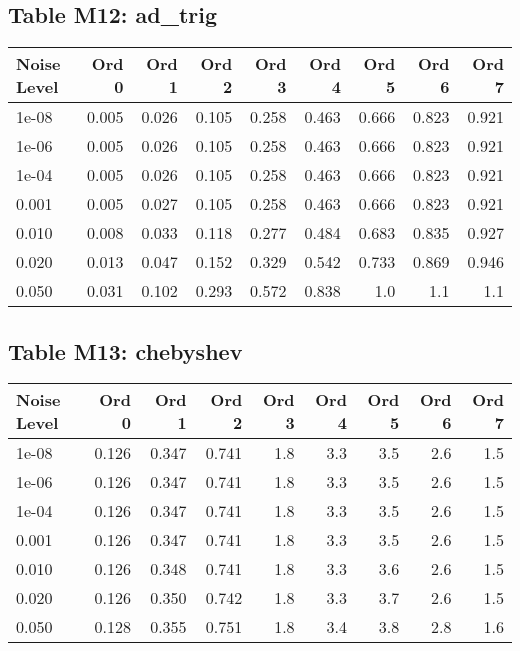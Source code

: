 \documentclass[10pt]{article}
\begin{document}
\clearpage

\subsection*{Table M12: ad\_trig}

\begin{longtable}{lrrrrrrrr}
\toprule
\textbf{Noise Level} & \textbf{Ord 0} & \textbf{Ord 1} & \textbf{Ord 2} & \textbf{Ord 3} & \textbf{Ord 4} & \textbf{Ord 5} & \textbf{Ord 6} & \textbf{Ord 7} \\
\midrule
\endhead
1e-08 & 0.005 & 0.026 & 0.105 & 0.258 & 0.463 & 0.666 & 0.823 & 0.921 \\
1e-06 & 0.005 & 0.026 & 0.105 & 0.258 & 0.463 & 0.666 & 0.823 & 0.921 \\
1e-04 & 0.005 & 0.026 & 0.105 & 0.258 & 0.463 & 0.666 & 0.823 & 0.921 \\
0.001 & 0.005 & 0.027 & 0.105 & 0.258 & 0.463 & 0.666 & 0.823 & 0.921 \\
0.010 & 0.008 & 0.033 & 0.118 & 0.277 & 0.484 & 0.683 & 0.835 & 0.927 \\
0.020 & 0.013 & 0.047 & 0.152 & 0.329 & 0.542 & 0.733 & 0.869 & 0.946 \\
0.050 & 0.031 & 0.102 & 0.293 & 0.572 & 0.838 & 1.0 & 1.1 & 1.1 \\
\bottomrule
\end{longtable}

\clearpage

\subsection*{Table M13: chebyshev}

\begin{longtable}{lrrrrrrrr}
\toprule
\textbf{Noise Level} & \textbf{Ord 0} & \textbf{Ord 1} & \textbf{Ord 2} & \textbf{Ord 3} & \textbf{Ord 4} & \textbf{Ord 5} & \textbf{Ord 6} & \textbf{Ord 7} \\
\midrule
\endhead
1e-08 & 0.126 & 0.347 & 0.741 & 1.8 & 3.3 & 3.5 & 2.6 & 1.5 \\
1e-06 & 0.126 & 0.347 & 0.741 & 1.8 & 3.3 & 3.5 & 2.6 & 1.5 \\
1e-04 & 0.126 & 0.347 & 0.741 & 1.8 & 3.3 & 3.5 & 2.6 & 1.5 \\
0.001 & 0.126 & 0.347 & 0.741 & 1.8 & 3.3 & 3.5 & 2.6 & 1.5 \\
0.010 & 0.126 & 0.348 & 0.741 & 1.8 & 3.3 & 3.6 & 2.6 & 1.5 \\
0.020 & 0.126 & 0.350 & 0.742 & 1.8 & 3.3 & 3.7 & 2.6 & 1.5 \\
0.050 & 0.128 & 0.355 & 0.751 & 1.8 & 3.4 & 3.8 & 2.8 & 1.6 \\
\bottomrule
\end{longtable}
\end{document}

